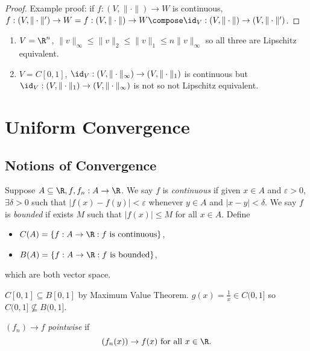 \documentclass[a4paper]{article}
\theoremstyle{definition}
\begin{document}
\begin{proof}
  Example proof: if \(f:(V, \|\cdot\|)\to W\) is continuous, \(f:(V,\|\cdot\|')\to W = f:(V, \|\cdot\|)\to W \compose \id_V:(V, \|\cdot\|) \to (V, \|\cdot\|')\).
\end{proof}

\begin{eg}\leavevmode
  \begin{enumerate}
  \item \(V=\R^n\), \(\|v\|_\infty \leq \|v\|_2 \leq \|v\|_1 \leq n \|v\|_\infty\) so all three are Lipschitz equivalent.
  \item \(V=C[0,1]\), \(\id_V:(V, \|\cdot\|_\infty)\to (V,\|\cdot\|_1)\) is continuous but \(\id_V:(V, \|\cdot\|_1)\to (V,\|\cdot\|_\infty)\) is not so not Lipschitz equivalent.
  \end{enumerate}
\end{eg}

\section{Uniform Convergence}

\subsection{Notions of Convergence}

Suppose \(A\subseteq \R, f, f_n: A\to \R\). We say \(f\) is \emph{continuous} if given \(x\in A\) and \(\varepsilon>0\), \(\exists \delta>0\) such that \(|f(x)-f(y)| < \varepsilon\) whenever \(y\in A\) and \(|x-y| < \delta\). We say \(f\) is \emph{bounded} if exists \(M\) such that \(|f(x)| \leq M\) for all \(x\in A\). Define
\begin{itemize}
\item \(C(A) = \{f: A\to \R: f \text{ is continuous}\}\),
\item \(B(A) = \{f:A\to \R: f \text{ is bounded}\}\),
\end{itemize}
which are both vector space.

\begin{eg}
  \(C[0,1] \subseteq B[0,1]\) by Maximum Value Theorem. \(g(x) = \frac{1}{x} \in C(0,1]\) so \(C(0,1] \nsubseteq B(0,1]\).
\end{eg}

\begin{defi}
  \((f_n) \to f\) \emph{pointwise} if
  \[
    (f_n(x)) \to f(x) \text{ for all } x\in \R.
    \]
\end{defi}
\end{document}
